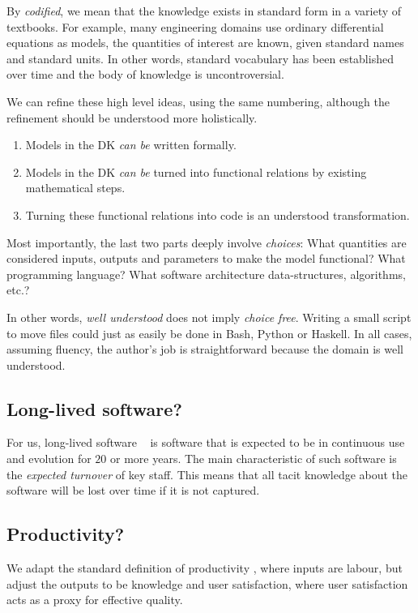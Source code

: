 \documentclass[sigconf,review,anonymous=false]{acmart}
\begin{document}
By \emph{codified}, we mean that the knowledge exists in standard form in a
variety of textbooks. For example, many engineering domains use
ordinary differential equations as models, the quantities of
interest are known, given standard names and standard units. In other words,
standard vocabulary has been established over time and the body of knowledge is
uncontroversial.

We can refine these high level ideas, using the same numbering,
although the refinement should be
understood more holistically.
\begin{enumerate}
\item Models in the DK \emph{can be} written formally.
\item Models in the DK \emph{can be} turned into functional relations by
 existing mathematical steps.
\item Turning these functional relations into code is an understood
 transformation.
\end{enumerate}
Most importantly, the last two parts
deeply involve \emph{choices}: What quantities are considered inputs, outputs
and parameters to make the model functional? What programming language?  What
software architecture data-structures, algorithms, etc.?

In other words,
\emph{well understood} does not imply \emph{choice free}.  Writing a small 
script to move files could just as easily be done in Bash, Python or Haskell.
In all cases, assuming fluency, the author's job is straightforward because
the domain is well understood.

\subsection{Long-lived software?}
For us, long-lived software ~\cite{SPL-long-lived}
is software that is expected to be in continuous
use and evolution for $20$ or more years. The main characteristic of
such software is the \emph{expected turnover} of key staff. This means that
all tacit knowledge about the software will be lost over time if it is not
captured.

\subsection{Productivity?}
We adapt the standard definition of productivity \cite{Boehm1987}, where inputs are labour,
but adjust the outputs to be knowledge and user satisfaction, where user
satisfaction acts as a proxy for effective quality.
\end{document}
